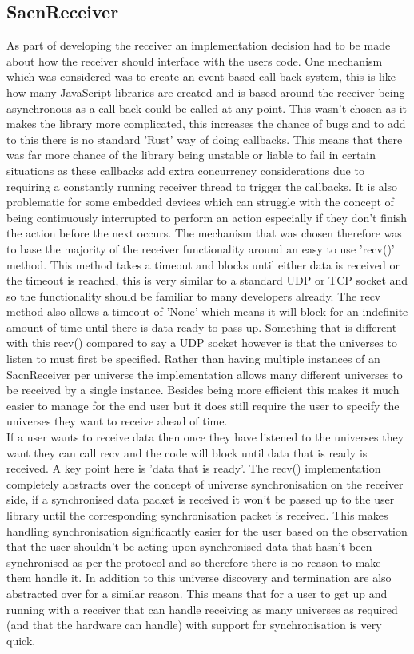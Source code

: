 \documentclass[11pt,a4paper]{article}
\begin{document}
\subsection{SacnReceiver}
As part of developing the receiver an implementation decision had to be made about how the receiver should interface with the users code. One mechanism which was considered was to create an event-based call back system, this is like how many JavaScript libraries are created and is based around the receiver being asynchronous as a call-back could be called at any point. This wasn't chosen as it makes the library more complicated, this increases the chance of bugs and to add to this there is no standard 'Rust' way of doing callbacks. This means that there was far more chance of the library being unstable or liable to fail in certain situations as these callbacks add extra concurrency considerations due to requiring a constantly running receiver thread to trigger the callbacks. It is also problematic for some embedded devices which can struggle with the concept of being continuously interrupted to perform an action especially if they don't finish the action before the next occurs. The mechanism that was chosen therefore was to base the majority of the receiver functionality around an easy to use 'recv()' method. This method takes a timeout and blocks until either data is received or the timeout is reached, this is very similar to a standard UDP or TCP socket and so the functionality should be familiar to many developers already. The recv method also allows a timeout of 'None' which means it will block for an indefinite amount of time until there is data ready to pass up. Something that is different with this recv() compared to say a UDP socket however is that the universes to listen to must first be specified. Rather than having multiple instances of an SacnReceiver per universe the implementation allows many different universes to be received by a single instance. Besides being more efficient this makes it much easier to manage for the end user but it does still require the user to specify the universes they want to receive ahead of time. \\

If a user wants to receive data then once they have listened to the universes they want they can call recv and the code will block until data that is ready is received. A key point here is 'data that is ready'. The recv() implementation completely abstracts over the concept of universe synchronisation on the receiver side, if a synchronised data packet is received it won't be passed up to the user library until the corresponding synchronisation packet is received. This makes handling synchronisation significantly easier for the user based on the observation that the user shouldn't be acting upon synchronised data that hasn't been synchronised as per the protocol and so therefore there is no reason to make them handle it. In addition to this universe discovery and termination are also abstracted over for a similar reason. This means that for a user to get up and running with a receiver that can handle receiving as many universes as required (and that the hardware can handle) with support for synchronisation is very quick.\\
\end{document}
